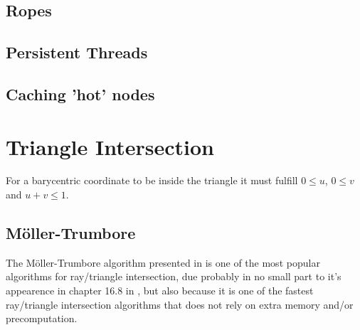 \subsection{Ropes}


\subsection{Persistent Threads}


\subsection{Caching 'hot' nodes}





\section{Triangle Intersection}



For a barycentric coordinate to be inside the triangle it must fulfill
$0 \le u$, $0 \le v$ and $u+v \le 1$.

\subsection{Möller-Trumbore}


The Möller-Trumbore algorithm presented in 
is one of the most popular algorithms for ray/triangle intersection,
due probably in no small part to it's appearence in chapter 16.8 in
, but also because it is one of the fastest
ray/triangle intersection algorithms that does not rely on extra
memory and/or precomputation.

